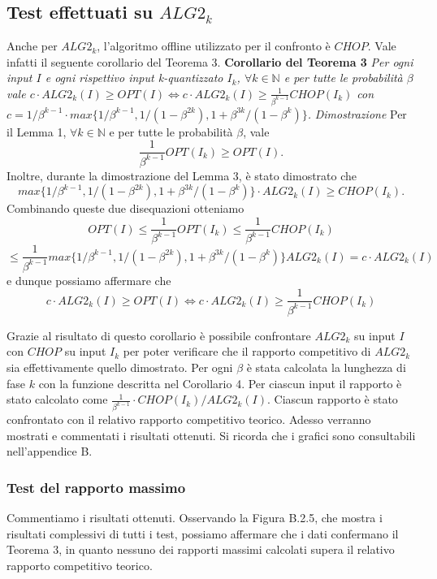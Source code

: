 \documentclass[12pt]{article}
\newcommand*{\N}{\mathbb{N}}
\begin{document}
\subsection{Test effettuati su $ALG2_{k}$}
Anche per $ALG2_{k}$, l’algoritmo offline utilizzato per il confronto è $CHOP$. Vale infatti il seguente corollario del Teorema 3.
\newline\newline
\textbf{Corollario del Teorema 3}
\textit{Per ogni input $I$ e ogni rispettivo input k-quantizzato $I_{k}$, $\forall k \in \N$ e per tutte le probabilità $\beta$ vale
$c \cdot ALG2_{k}(I) \geq OPT(I) \iff c \cdot ALG2_{k}(I) \geq \frac{1}{\beta^{k-1}} CHOP(I_{k})$ con $c = 1 / \beta^{k - 1} \cdot max \{1 / \beta^{k - 1}, 1 / (1 - \beta^{2k}), 1 + \beta^{3k} / (1 - \beta^{k})\}$.}
\newline \newline
\textit{Dimostrazione} 
Per il Lemma 1, $\forall k \in \N$ e per tutte le probabilità $\beta$, vale $$\frac{1}{\beta^{k-1}} OPT(I_{k}) \geq OPT(I).$$
Inoltre, durante la dimostrazione del Lemma 3, è stato dimostrato che $$max \{1 / \beta^{k - 1}, 1 / (1 - \beta^{2k}), 1 + \beta^{3k} / (1 - \beta^{k})\} \cdot ALG2_{k}(I) \geq CHOP(I_{k}).$$
Combinando queste due disequazioni otteniamo
$$OPT(I) \leq \frac{1}{\beta^{k-1}} OPT(I_{k}) \leq \frac{1}{\beta^{k-1}} CHOP(I_{k})$$ $$\leq \frac{1}{\beta^{k-1}} max \{1 / \beta^{k - 1}, 1 / (1 - \beta^{2k}), 1 + \beta^{3k} / (1 - \beta^{k})\} ALG2_{k}(I) = c \cdot ALG2_{k}(I)$$
e dunque possiamo affermare che
\begin{equation}
c \cdot ALG2_{k}(I) \geq OPT(I) \iff c \cdot ALG2_{k}(I) \geq \frac{1}{\beta^{k-1}} CHOP(I_{k}) \tag*{$\square$}
\end{equation}

Grazie al risultato di questo corollario è possibile confrontare $ALG2_{k}$ su input $I$ con $CHOP$ su input $I_{k}$ per poter verificare che il rapporto competitivo di $ALG2_{k}$ sia effettivamente quello dimostrato. Per ogni $\beta$ è stata calcolata la lunghezza di fase $k$ con la funzione descritta nel Corollario 4. Per ciascun input il rapporto è stato calcolato come $\frac{1}{\beta^{k-1}} \cdot CHOP(I_{k}) / ALG2_{k}(I)$. Ciascun rapporto è stato confrontato con il relativo rapporto competitivo teorico. Adesso verranno mostrati e commentati i risultati ottenuti. Si ricorda che i grafici sono consultabili nell'appendice B.
\subsubsection{Test del rapporto massimo}
Commentiamo i risultati ottenuti. Osservando la Figura B.2.5, che mostra i risultati complessivi di tutti i test, possiamo affermare che i dati confermano il Teorema 3, in quanto nessuno dei rapporti massimi calcolati supera il relativo rapporto competitivo teorico.
\end{document}
